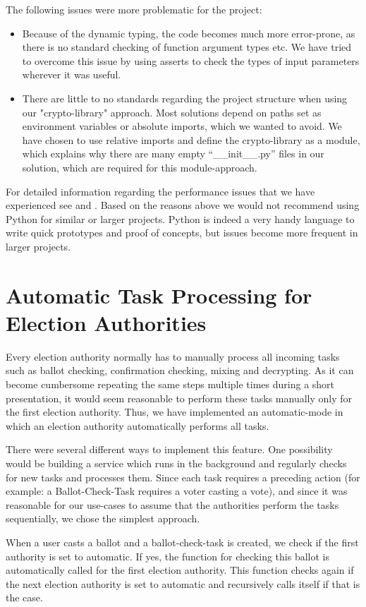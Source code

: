 The following issues were more problematic for the project:
\begin{itemize}
	\item Because of the dynamic typing, the code becomes much more error-prone, as there is no standard checking of function argument types etc. We have tried to overcome this issue by using asserts to check the types of input parameters wherever it was useful.
	\item There are little to no standards regarding the project structure when using our "{}crypto-library"{} approach. Most solutions depend on paths set as environment variables or absolute imports, which we wanted to avoid. We have chosen to use relative imports and define the crypto-library as a module, which explains why there are many empty "`\_\_init\_\_.py"' files in our solution, which are required for this module-approach.
\end{itemize}

For detailed information regarding the performance issues that we have experienced see \cite{slowpy} and \cite{slowpy2}. Based on the reasons above we would not recommend using Python for similar or larger projects. Python is indeed a very handy language to write quick prototypes and proof of concepts, but issues become more frequent in larger projects.

\section{Automatic Task Processing for Election Authorities}
Every election authority normally has to manually process all incoming tasks such as ballot checking, confirmation checking, mixing and decrypting. As it can become cumbersome repeating the same steps multiple times during a short presentation, it would seem reasonable to perform these tasks manually only for the first election authority. Thus, we have implemented an automatic-mode in which an election authority automatically performs all tasks.

There were several different ways to implement this feature. One possibility would be building a service which runs in the background and regularly checks for new tasks and processes them. Since each task requires a preceding action (for example: a Ballot-Check-Task requires a voter casting a vote), and since it was reasonable for our use-cases to assume that the authorities perform the tasks sequentially, we chose the simplest approach.

When a user casts a ballot and a ballot-check-task is created, we check if the first authority is set to automatic. If yes, the function for checking this ballot is automatically called for the first election authority. This function checks again if the next election authority is set to automatic and recursively calls itself if that is the case.

